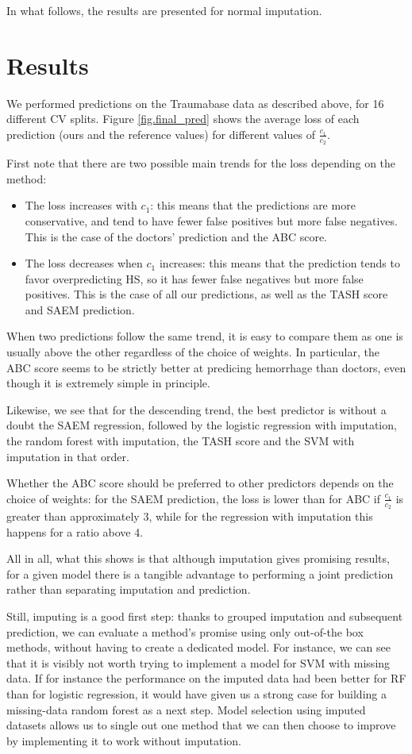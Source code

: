 In what follows, the results are presented for normal imputation.

	\section{Results}
We performed predictions on the Traumabase data as described above, for 16 different CV splits. Figure \ref{fig.final_pred} shows the average loss of each prediction (ours and the reference values) for different values of $\frac{c_1}{c_2}$. 



First note that there are two possible main trends for the loss depending on the method:
\begin{itemize}
\item The loss increases with $c_1$: this means that the predictions are more conservative, and tend to have fewer false positives but more false negatives. This is the case of the doctors' prediction and the ABC score.
\item The loss decreases when $c_1$ increases: this means that the prediction tends to favor overpredicting HS, so it has fewer false negatives but more false positives. This is the case of all our predictions, as well as the TASH score and SAEM prediction.
\end{itemize}

When two predictions follow the same trend, it is easy to compare them as one is usually above the other regardless of the choice of weights. In particular, the ABC score seems to be strictly better at predicing hemorrhage than doctors, even though it is extremely simple in principle.

Likewise, we see that for the descending trend, the best predictor is without a doubt the SAEM regression, followed by the logistic regression with imputation, the random forest with imputation, the TASH score and the SVM with imputation in that order.

Whether the ABC score should be preferred to other predictors depends on the choice of weights: for the SAEM prediction, the loss is lower than for ABC if $\frac{c_1}{c_2}$ is greater than approximately 3, while for the regression with imputation this happens for a ratio above 4.

All in all, what this shows is that although imputation gives promising results, for a given model there is a tangible advantage to performing a joint prediction rather than separating imputation and prediction. 

Still, imputing is a good first step: thanks to grouped imputation and subsequent prediction, we can evaluate a method's promise using only out-of-the box methods, without having to create a dedicated model. For instance, we can see that it is visibly not worth trying to implement a model for SVM with missing data. If for instance the performance on the imputed data had been better for RF than for logistic regression, it would have given us a strong case for building a missing-data random forest as a next step. Model selection using imputed datasets allows us to single out one method that we can then choose to improve by implementing it to work without imputation. 